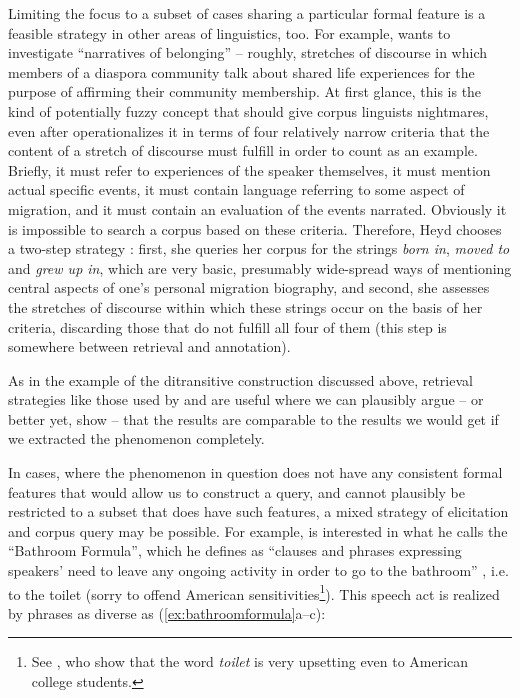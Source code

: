 Limiting the focus to a subset of cases sharing a particular formal feature is a feasible strategy in other areas of linguistics, too. For example, \citet{heyd_narratives_2016} wants to investigate ``narratives of belonging'' -- roughly, stretches of discourse in which members of a diaspora community talk about shared life experiences for the purpose of affirming their community membership. At first glance, this is the kind of potentially fuzzy concept that should give corpus linguists nightmares, even after \citet[292]{heyd_narratives_2016} operationalizes  it in terms of four relatively narrow criteria that the content of a stretch of discourse must fulfill in order to count as an example. Briefly, it must refer to experiences of the speaker themselves, it must mention actual specific events, it must contain language referring to some aspect of migration, and it must contain an evaluation of the events narrated. Obviously it is impossible to search a corpus based on these criteria. Therefore, Heyd chooses a two\hyp{}step strategy \citep[294]{heyd_narratives_2016}: first, she queries  her corpus for the strings \emph{born in}, \emph{moved to} and \emph{grew up in}, which are very basic, presumably wide\hyp{}spread ways of mentioning central aspects of one's personal migration biography, and second, she assesses the stretches of discourse within which these strings occur on the basis of her criteria, discarding those that do not fulfill all four of them (this step is somewhere between retrieval  and  annotation).

As in the example of the ditransitive  construction discussed above, retrieval  strategies like those used by \citet{stefanowitsch_words_2006} and \citet{heyd_narratives_2016} are useful where we can plausibly argue -- or better yet, show -- that the results are comparable to the results we would get if we extracted  the phenomenon completely.

In cases, where the phenomenon in question does not have any consistent formal features that would allow us to construct a query,  and cannot plausibly be restricted to a subset that does have such features, a mixed strategy of elicitation  and corpus query may be possible. For example, \citet{levin_bathroom_2014} is interested in what he calls the ``Bathroom Formula'', which he defines as ``clauses and phrases expressing speakers' need to leave any ongoing activity in order to go to the bathroom'' \citet[2]{levin_bathroom_2014}, i.e. to the toilet (sorry to offend American  sensitivities\footnote{See \citet{manning_words_1974}, who show that the word \textit{toilet} is very upsetting even to American college students.}). This speech act is realized by phrases as diverse as (\ref{ex:bathroomformula}a--c):

